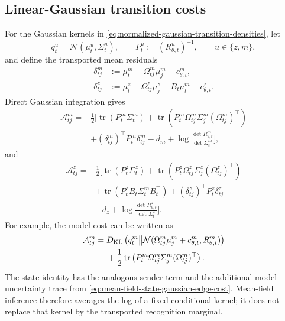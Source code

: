 \subsection{Linear-Gaussian transition costs}

For the Gaussian kernels in \cref{eq:normalized-gaussian-transition-densities}, let
\begin{equation}
q_t^u=\mathcal N(\mu_t^u,\Sigma_t^u),
\qquad
P_t^u:=(R_{\theta,t}^u)^{-1},
\qquad u\in\{z,m\},
\label{eq:mean-field-gaussian-factor-notation}
\end{equation}
and define the transported mean residuals
\begin{equation}
\begin{aligned}
\delta_{tj}^m
&:=\mu_t^m-\Omega_{tj}^m\mu_j^m-c_{\theta,t}^m,\\
\delta_{tj}^z
&:=\mu_t^z-\Omega_{tj}^z\mu_j^z-B_t\mu_t^m-c_{\theta,t}^z.
\end{aligned}
\label{eq:mean-field-gaussian-edge-residuals}
\end{equation}
Direct Gaussian integration gives
\begin{equation}
\begin{aligned}
\mathcal A_{tj}^m
= {}&\frac12\Bigg[
\operatorname{tr}(P_t^m\Sigma_t^m)
+\operatorname{tr}\left(
P_t^m\Omega_{tj}^m\Sigma_j^m(\Omega_{tj}^m)^\top
\right)\\
&+(\delta_{tj}^m)^\top P_t^m\delta_{tj}^m
-d_m
+\log\frac{\det R_{\theta,t}^m}{\det\Sigma_t^m}
\Bigg],
\end{aligned}
\label{eq:mean-field-model-gaussian-edge-cost}
\end{equation}
and
\begin{equation}
\begin{aligned}
\mathcal A_{tj}^z
= {}&\frac12\Bigg[
\operatorname{tr}(P_t^z\Sigma_t^z)
+\operatorname{tr}\left(
P_t^z\Omega_{tj}^z\Sigma_j^z(\Omega_{tj}^z)^\top
\right)\\
&+\operatorname{tr}\left(
P_t^zB_t\Sigma_t^mB_t^\top
\right)
+(\delta_{tj}^z)^\top P_t^z\delta_{tj}^z\\
&-d_z
+\log\frac{\det R_{\theta,t}^z}{\det\Sigma_t^z}
\Bigg].
\end{aligned}
\label{eq:mean-field-state-gaussian-edge-cost}
\end{equation}
For example, the model cost can be written as
\begin{equation}
\begin{aligned}
\mathcal A_{tj}^m
={}&D_{\mathrm{KL}}\left(
q_t^m
\middle\Vert
\mathcal N(
\Omega_{tj}^m\mu_j^m+c_{\theta,t}^m,
R_{\theta,t}^m)
\right)\\
&+\frac12\operatorname{tr}\left(
P_t^m\Omega_{tj}^m\Sigma_j^m(\Omega_{tj}^m)^\top
\right).
\end{aligned}
\label{eq:mean-field-model-edge-kl-plus-uncertainty}
\end{equation}
The state identity has the analogous sender term and the additional model-uncertainty trace from \cref{eq:mean-field-state-gaussian-edge-cost}. Mean-field inference therefore averages the log of a fixed conditional kernel; it does not replace that kernel by the transported recognition marginal.

